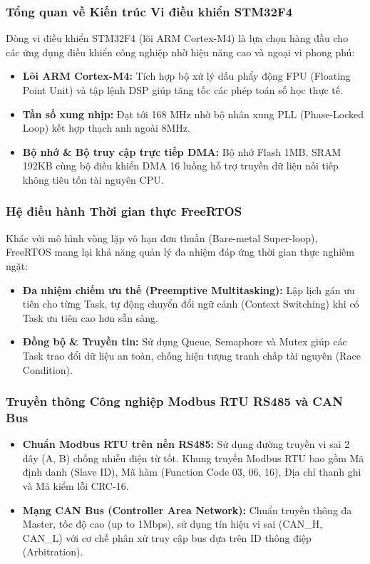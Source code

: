 \documentclass{article}
\begin{document}
\subsubsection{Tổng quan về Kiến trúc Vi điều khiển STM32F4}
Dòng vi điều khiển STM32F4 (lõi ARM Cortex-M4) là lựa chọn hàng đầu cho các ứng dụng điều khiển công nghiệp nhờ hiệu năng cao và ngoại vi phong phú:
\begin{itemize}
    \item \textbf{Lõi ARM Cortex-M4:} Tích hợp bộ xử lý dấu phẩy động FPU (Floating Point Unit) và tập lệnh DSP giúp tăng tốc các phép toán số học thực tế.
    \item \textbf{Tần số xung nhịp:} Đạt tới 168 MHz nhờ bộ nhân xung PLL (Phase-Locked Loop) kết hợp thạch anh ngoài 8MHz.
    \item \textbf{Bộ nhớ \& Bộ truy cập trực tiếp DMA:} Bộ nhớ Flash 1MB, SRAM 192KB cùng bộ điều khiển DMA 16 luồng hỗ trợ truyền dữ liệu nối tiếp không tiêu tốn tài nguyên CPU.
\end{itemize}

\subsubsection{Hệ điều hành Thời gian thực FreeRTOS}
Khác với mô hình vòng lặp vô hạn đơn thuần (Bare-metal Super-loop), FreeRTOS mang lại khả năng quản lý đa nhiệm đáp ứng thời gian thực nghiêm ngặt:
\begin{itemize}
    \item \textbf{Đa nhiệm chiếm ưu thế (Preemptive Multitasking):} Lập lịch gán ưu tiên cho từng Task, tự động chuyển đổi ngữ cảnh (Context Switching) khi có Task ưu tiên cao hơn sẵn sàng.
    \item \textbf{Đồng bộ \& Truyền tin:} Sử dụng Queue, Semaphore và Mutex giúp các Task trao đổi dữ liệu an toàn, chống hiện tượng tranh chấp tài nguyên (Race Condition).
\end{itemize}

\subsubsection{Truyền thông Công nghiệp Modbus RTU RS485 và CAN Bus}
\begin{itemize}
    \item \textbf{Chuẩn Modbus RTU trên nền RS485:} Sử dụng đường truyền vi sai 2 dây (A, B) chống nhiễu điện từ tốt. Khung truyền Modbus RTU bao gồm Mã định danh (Slave ID), Mã hàm (Function Code 03, 06, 16), Địa chỉ thanh ghi và Mã kiểm lỗi CRC-16.
    \item \textbf{Mạng CAN Bus (Controller Area Network):} Chuẩn truyền thông đa Master, tốc độ cao (up to 1Mbps), sử dụng tín hiệu vi sai (CAN\_H, CAN\_L) với cơ chế phân xử truy cập bus dựa trên ID thông điệp (Arbitration).
\end{itemize}
\end{document}
